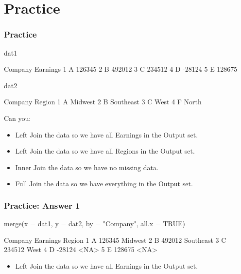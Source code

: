 \documentclass[10pt,american]{beamer}
\renewenvironment{Schunk}{}{}
\renewenvironment{Sinput}{}{}
\begin{document}
\section{Practice}
\begin{frame}[containsverbatim]
\frametitle{Practice}

\begin{Schunk}
\begin{Sinput}
 dat1
\end{Sinput}
\begin{Soutput}
  Company Earnings
1       A   126345
2       B   492012
3       C   234512
4       D   -28124
5       E   128675
\end{Soutput}
\begin{Sinput}
 dat2
\end{Sinput}
\begin{Soutput}
  Company    Region
1       A   Midwest
2       B Southeast
3       C      West
4       F     North
\end{Soutput}
\end{Schunk}
Can you:
\begin{itemize}
\item Left Join the data so we have all Earnings in the Output set.
\item Left Join the data so we have all Regions in the Output set.
\item Inner Join the data so we have no missing data.
\item Full Join the data so we have everything in the Output set. 
\end{itemize}
\end{frame}




\begin{frame}[containsverbatim]
\frametitle{Practice: Answer 1}
\begin{Schunk}
\begin{Sinput}
 merge(x = dat1, y = dat2, by = "Company", all.x = TRUE)
\end{Sinput}
\begin{Soutput}
  Company Earnings    Region
1       A   126345   Midwest
2       B   492012 Southeast
3       C   234512      West
4       D   -28124      <NA>
5       E   128675      <NA>
\end{Soutput}
\end{Schunk}
\begin{itemize}
\item Left Join the data so we have all Earnings in the Output set.
\end{itemize}
\end{frame}
\end{document}
